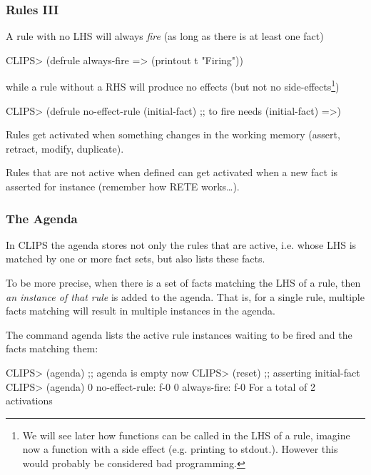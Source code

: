 \documentclass[xcolor={usenames,dvipsnames,svgnames}, compress]{beamer}
\begin{document}
\begin{frame}[fragile]
  \frametitle{Rules III}
  A rule with no LHS will always \emph{fire} (as long as there is at
  least one fact)
  \begin{clips-code}
    CLIPS> (defrule always-fire
               =>
               (printout t "Firing"))
  \end{clips-code}
  while a rule without a RHS will produce no effects (but not no
  side-effects\footnote{We will see later how functions can be called
    in the LHS of a rule, imagine now a function with a side effect
    (e.g. printing to stdout.). However this would probably be
    considered bad programming.})
  \begin{clips-code}[firstnumber=4]
    CLIPS> (defrule no-effect-rule
               (initial-fact) ;; to fire needs (initial-fact)
               =>)
  \end{clips-code}\bigskip
  
  Rules get activated when something changes in the working memory
  (\textsf{assert}, \textsf{retract}, \textsf{modify},
  \textsf{duplicate}).\par
  Rules that are not active when defined can get activated when a new
  fact is asserted for instance (remember how RETE works\dots).
\end{frame}

\begin{frame}[fragile]
  \frametitle{The Agenda}
  In CLIPS the agenda stores not only the rules that are active,
  i.e. whose LHS is matched by one or more fact sets, but also lists
  these facts.\par\bigskip
  
  To be more precise,  when there is a set of facts matching the LHS of
  a rule, then \emph{an instance of that rule} is added to the
  \textsf{agenda}. That is, for a single rule, multiple facts
  matching will result in multiple instances in the agenda.\par\bigskip
  
  The command \textsf{agenda} lists the active rule instances waiting to be fired and the facts
  matching them:
  \begin{clips-code}[firstnumber=7]
    CLIPS> (agenda) ;; agenda is empty now
    CLIPS> (reset)  ;; asserting initial-fact
    CLIPS> (agenda)
    0      no-effect-rule: f-0
    0      always-fire: f-0
    For a total of 2 activations
  \end{clips-code}
  
\end{frame}
\end{document}
